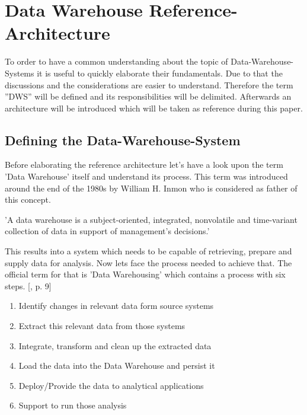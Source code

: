 \section{Data Warehouse Reference-Architecture}
\label{sec:referenceArchitecture}
To order to have a common understanding about the topic of Data-Warehouse-Systems it is useful to quickly elaborate their fundamentals. Due to that the discussions and the considerations are easier to understand.\newline
Therefore the term ''DWS'' will be defined and its responsibilities will be delimited. Afterwards an architecture will be introduced which will be taken as reference during this paper.

\subsection{Defining the Data-Warehouse-System}
Before elaborating the reference architecture let's have a look upon the term 'Data Warehouse' itself and understand its process.\newline
This term was introduced around the end of the 1980s by William H. Inmon who is considered as father of this concept.
\begin{definition}
'A data warehouse is a subject-oriented, integrated, nonvolatile and time-variant collection of data in support of management's decisions.'\cite{buildingTheDWS}
\end{definition}
This results into a system which needs to be capable of retrieving, prepare and supply data for analysis.\newline
Now lets face the process needed to achieve that. The official term for that is 'Data Warehousing' which contains a process with six steps. [\cite{dwsRefArchitecture}, p. 9]
\begin{enumerate}
    \item Identify changes in relevant data form source systems
    \item Extract this relevant data from those systems
    \item Integrate, transform and clean up the extracted data
    \item Load the data into the Data Warehouse and persist it
    \item Deploy/Provide the data to analytical applications 
    \item Support to run those analysis
\end{enumerate}

